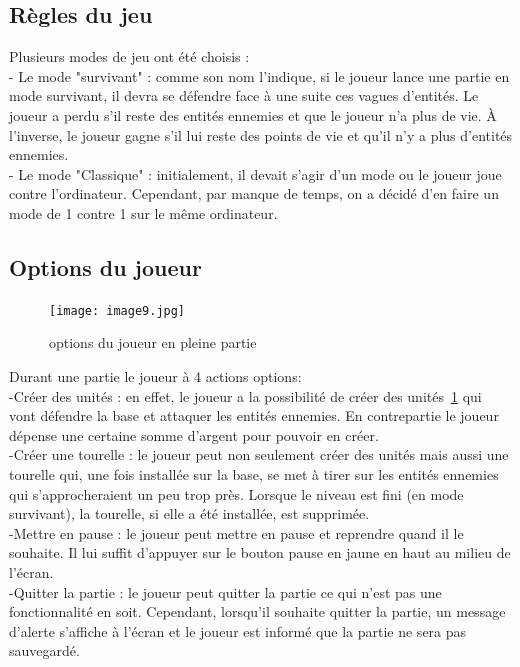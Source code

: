 \documentclass[a4paper,11pt]{article}
\begin{document}
\subsection {Règles du jeu}

Plusieurs modes de jeu ont été choisis :\\
- Le mode "survivant" : comme son nom l'indique, si le joueur lance une partie en mode survivant, il devra se défendre face à une suite ces vagues
d'entités. Le joueur a perdu s'il reste des entités ennemies et que le joueur n'a plus de vie. À l'inverse, le joueur gagne s'il lui reste des 
points de vie et qu'il n'y a plus d'entités ennemies.\\
- Le mode "Classique" : initialement, il devait s'agir d'un mode ou le joueur joue contre l'ordinateur. Cependant, par manque de temps, on a décidé 
d'en faire un mode de 1 contre 1 sur le même ordinateur.

\subsection {Options du joueur}
\begin{figure}[ht!]
\centering
\texttt{[image: image9.jpg]} 
\caption {\label{image1} options du joueur en pleine partie}
\end{figure}
 \smallbreak
Durant une partie le joueur à 4 actions options:\\
-Créer des unités : en effet, le joueur a la possibilité de créer des unités~\ref{image1} qui vont défendre la base et attaquer les entités ennemies.
En contrepartie le joueur dépense une certaine somme d'argent pour pouvoir en créer.\\

-Créer une tourelle : le joueur peut non seulement créer des unités mais aussi une tourelle qui, une fois installée sur la base,
se met à tirer sur les entités ennemies qui s'approcheraient un peu trop près. Lorsque le niveau est fini (en mode survivant),
la tourelle, si elle a été installée, est supprimée.\\ 

-Mettre en pause : le joueur peut mettre en pause et reprendre quand il le souhaite. Il lui suffit d'appuyer sur le bouton pause en jaune en haut au milieu de l'écran.\\

-Quitter la partie : le joueur peut quitter la partie ce qui n'est pas une fonctionnalité en soit. Cependant, lorsqu'il souhaite
quitter la partie, un message d'alerte s'affiche à l'écran et le joueur est informé que la partie ne sera pas sauvegardé.\\
\end{document}

